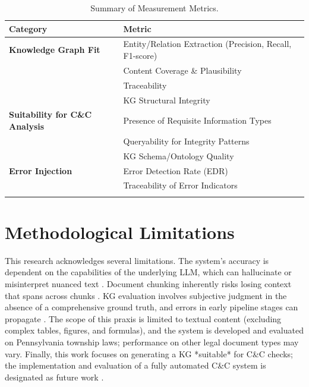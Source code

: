 \begin{table}[htbp]
\centering
{}
\caption{Summary of Measurement Metrics.}
\label{tab:measurement_metrics_summary}
\begin{tabularx}{\textwidth}{@{} lX @{}}
\toprule
\textbf{Category} & \textbf{Metric} \\
\midrule
\addlinespace
\textbf{Knowledge Graph Fit} & Entity/Relation Extraction (Precision, Recall, F1-score) \\
& Content Coverage \& Plausibility \\
& Traceability \\
& KG Structural Integrity \\
\addlinespace
\hline
\addlinespace
\textbf{Suitability for C\&C Analysis} & Presence of Requisite Information Types \\
& Queryability for Integrity Patterns \\
& KG Schema/Ontology Quality \\
\addlinespace
\hline
\addlinespace
\textbf{Error Injection} & Error Detection Rate (EDR) \\
& Traceability of Error Indicators \\
\addlinespace
\bottomrule
\end{tabularx}
\end{table}

\section{Methodological Limitations}
This research acknowledges several limitations. The system's accuracy is dependent on the capabilities of the underlying LLM, which can hallucinate or misinterpret nuanced text \parencite{RefWorks:RefID:101-zhao2023survey}. Document chunking inherently risks losing context that spans across chunks \parencite{RefWorks:RefID:104-qu2024semantic}. KG evaluation involves subjective judgment in the absence of a comprehensive ground truth, and errors in early pipeline stages can propagate \parencite{RefWorks:RefID:121-zhong2024comprehensive}. The scope of this praxis is limited to textual content (excluding complex tables, figures, and formulas), and the system is developed and evaluated on Pennsylvania township laws; performance on other legal document types may vary. Finally, this work focuses on generating a KG *suitable* for C\&C checks; the implementation and evaluation of a fully automated C\&C system is designated as future work \parencite{RefWorks:RefID:10-zowghi2003interplay}.

